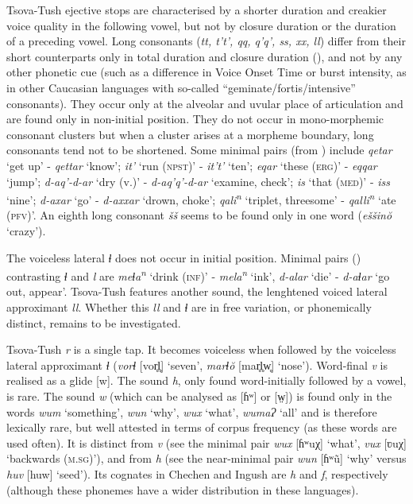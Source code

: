 Tsova-Tush ejective stops are characterised by a shorter duration and creakier voice quality in the following
vowel, but not by closure duration or the duration of
a preceding vowel. Long consonants (\textit{tt, t't', qq, q'q', ss, xx, ll})  differ from their short counterparts only in total duration and closure duration (\cite{haukhakim}), and not by any other phonetic cue (such as a difference in Voice Onset Time or burst intensity, as in other Caucasian languages with so-called ``geminate\slash fortis\slash intensive'' consonants). They occur only at the alveolar and uvular place of articulation and are found only in non-initial position. They do not occur in mono\hyp morphemic consonant clusters but when a cluster arises at a morpheme boundary, long consonants tend not to be shortened.
Some minimal pairs (from \cite{haukharris}) include \textit{qetar} `get up' - \textit{qettar} `know'; \textit{it'} `run (\textsc{npst})' - \textit{it't'} `ten'; \textit{eqar} `these (\textsc{erg})' - \textit{eqqar} `jump'; \textit{d-aq’-d-ar} `dry (v.)’ - \textit{d-aq’q'-d-ar} `examine, check'; \textit{is} `that (\textsc{med})' - \textit{iss} `nine'; \textit{d-axar} `go’ - \textit{d-axxar} `drown, choke'; \textit{qali\textsuperscript{n}} `triplet, threesome' - \textit{qalli\textsuperscript{n} } `ate (\textsc{pfv})'. An eighth long consonant \textit{šš} seems to be found only in one word (\textit{eššin\u{o}} ‘crazy’).




The voiceless lateral \textit{ɬ} does not occur in initial position. Minimal pairs (\cite{haukharris}) contrasting \textit{ɬ} and \textit{l} are \textit{meɬa\textsuperscript{n}} `drink (\textsc{inf})' - \textit{mela\textsuperscript{n}} `ink', \textit{d-alar} `die' - \textit{d-aɬar} `go out, appear'. Tsova-Tush features another sound, the lenghtened voiced lateral approximant \textit{ll}. Whether this \textit{ll} and \textit{ɬ} are in free variation, or phonemically distinct, remains to be investigated.



Tsova-Tush \textit{r} is a single tap. It becomes voiceless when followed by the voiceless lateral approximant \textit{ɬ} (\textit{vorɬ} [vor̥l̥] `seven', \textit{marɬ\u{o}} [mar̥l̥w̥] ‘nose’).  Word-final \textit{v} is realised as a glide [w]. The sound \textit{h}, only found word-initially followed by a vowel, is rare. The sound \textit{w} (which can be analysed as [ɦʷ] or [w̤]) is found only in the words \textit{wum} `something', \textit{wun} `why', \textit{wux} `what', \textit{wumaɁ} `all' and is therefore lexically rare, but well attested in terms of corpus frequency (as these words are used often). It is distinct from \textit{v} (see the minimal pair \textit{wux} [ɦʷuχ] `what', \textit{vux} [ʋuχ] `backwards (\textsc{m.sg})'), and from \textit{h} (see the near-minimal pair \textit{wun} [ɦʷũ] `why' versus \textit{huv} [huw] `seed'). Its cognates in Chechen and Ingush are \textit{h} and \textit{f}, respectively (although these phonemes have a wider distribution in these languages).


